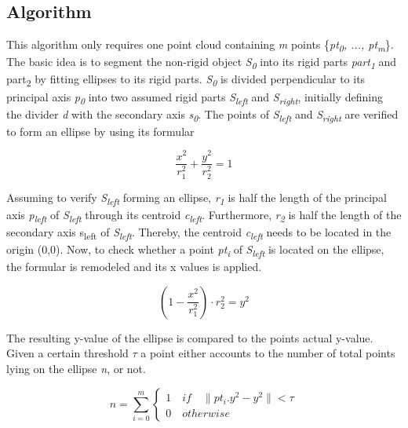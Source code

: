 \documentclass[a4paper,english,11pt]{report}
\begin{document}
\subsection{Algorithm}

This algorithm only requires one point cloud containing \textit{m} points \{\textit{pt\textsubscript{0}, ..., pt\textsubscript{m}}\}. The basic idea is to segment the non-rigid object  \textit{S\textsubscript{0}} into its rigid parts \textit{part\textsubscript{1}} and {part\textsubscript{2}} by fitting ellipses to its rigid parts. 
\textit{S\textsubscript{0}} is divided perpendicular to its principal axis \textit{p\textsubscript{0}} into two assumed rigid parts \textit{S\textsubscript{left}} and \textit{S\textsubscript{right}}, initially defining the divider \textit{d} with the secondary axis \textit{s\textsubscript{0}}. The points of \textit{S\textsubscript{left}} and \textit{S\textsubscript{right}} are verified to 
form an ellipse by using its formular

\begin{equation}
\dfrac{x^2}{r_1^2} + \dfrac{y^2}{r_2^2} = 1
\end{equation}

Assuming to verify \textit{S\textsubscript{left}} forming an ellipse, \textit{r\textsubscript{1}} is half the length of the principal axis \textit{p\textsubscript{left}} of \textit{S\textsubscript{left}} through its centroid \textit{c\textsubscript{left}}. Furthermore, \textit{r\textsubscript{2}} is half the length of the secondary axis {s\textsubscript{left}} of \textit{S\textsubscript{left}}. Thereby, the centroid \textit{c\textsubscript{left}} needs to be located in the origin (0,0). 
Now, to check whether a point \textit{pt\textsubscript{i}} of \textit{S\textsubscript{left}} is located on the ellipse, the formular is remodeled and its x values is applied. 

\begin{equation}
(1 -  \dfrac{x^2}{r_1^2}) \cdot {r_2^2} = y^2
\end{equation}

The resulting y-value of the ellipse is compared to the points actual y-value. Given a certain threshold $\tau$ a point either accounts to the number of total points lying on the ellipse \textit{n}, or not.

\begin{equation}
n = \sum_{i=0}^{m}\begin{cases}1 \quad if \quad \|pt_i.y^2 - y^2 \| < \tau \\ 0 \quad otherwise\end{cases}
\end{equation}
\end{document}
